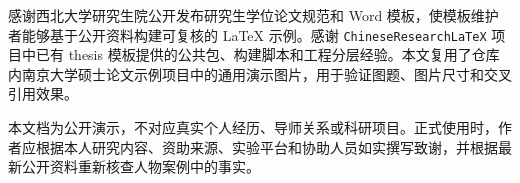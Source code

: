 感谢西北大学研究生院公开发布研究生学位论文规范和 Word 模板，使模板维护者能够基于公开资料构建可复核的 LaTeX 示例。感谢 \texttt{ChineseResearchLaTeX} 项目中已有 thesis 模板提供的公共包、构建脚本和工程分层经验。本文复用了仓库内南京大学硕士论文示例项目中的通用演示图片，用于验证图题、图片尺寸和交叉引用效果。

本文档为公开演示，不对应真实个人经历、导师关系或科研项目。正式使用时，作者应根据本人研究内容、资助来源、实验平台和协助人员如实撰写致谢，并根据最新公开资料重新核查人物案例中的事实。
